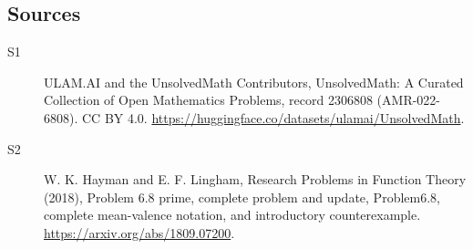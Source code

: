 \documentclass[11pt]{article}
\begin{document}
\subsection{Sources}
\begin{description}
\item[\hypertarget{source:2306808:1}{S1}] ULAM.AI and the UnsolvedMath Contributors, UnsolvedMath: A Curated Collection of Open Mathematics Problems, record 2306808 (AMR-022-6808). CC BY 4.0. \url{https://huggingface.co/datasets/ulamai/UnsolvedMath}.
\item[\hypertarget{source:2306808:2}{S2}] W. K. Hayman and E. F. Lingham, Research Problems in Function Theory (2018), Problem 6.8 prime, complete problem and update, Problem6.8, complete mean-valence notation, and introductory counterexample. \url{https://arxiv.org/abs/1809.07200}.
\end{description}
\label{end:2306808}
\end{document}
